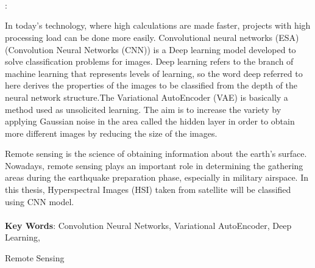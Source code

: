 \chapter*{ \normalfont \abstractName}

\begin{center}
    \vspace{-1.25cm}
    \abstracContentName \\
    \vspace{0.33cm}
    \titleEN \\
    \vspace{0.33cm}
    \studentNameFill \\
    \vspace{0.33cm}
    \ktuEN \\
    \titleFacEN \\
    \anabilimEN \\ 
    \advisorEN : \adviscorENFill
\end{center}
\vspace{0.5cm}
\hspace{0.8cm} In today's technology, where high calculations are made faster, projects with high processing load can be done more easily. Convolutional neural networks (ESA) (Convolution Neural Networks (CNN)) is a Deep learning model developed to solve classification problems for images.
Deep learning refers to the branch of machine learning that represents levels of learning, so the word deep referred to here derives the properties of the images to be classified from the depth of the neural network structure.The Variational AutoEncoder (VAE) is basically a method used as unsolicited learning. The aim is to increase the variety by applying Gaussian noise in the area called the hidden layer in order to obtain more different images by reducing the size of the images.

Remote sensing is the science of obtaining information about the earth's surface. Nowadays, remote sensing plays an important role in determining the gathering areas during the earthquake preparation phase, especially in military airspace. In this thesis, Hyperspectral Images (HSI) taken from satellite will be classified using CNN model.
\\
\\
\textbf{Key Words}: Convolution Neural Networks, Variational AutoEncoder, Deep Learning,


                    \hspace{1.12cm} Remote Sensing

